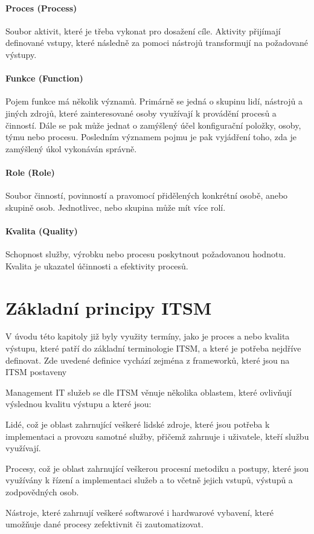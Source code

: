 \documentclass[
  digital,     %
  twoside,     %
  lof,         %
  lot,         %
]{fithesis4}
\begin{document}
\paragraph{Proces (Process)}
Soubor aktivit, které je třeba vykonat pro dosažení cíle. Aktivity přijímají definované vstupy, které následně za pomoci nástrojů transformují na požadované výstupy.
\paragraph{Funkce (Function)}
Pojem funkce má několik významů. Primárně se jedná o skupinu lidí, nástrojů a jiných zdrojů, které zainteresované osoby využívají k provádění procesů a činností. Dále se pak může jednat o zamýšlený účel konfigurační položky, osoby, týmu nebo procesu. Posledním významem pojmu je pak vyjádření toho, zda je zamýšlený úkol vykonáván správně. 
\paragraph{Role (Role)}
Soubor činností, povinností a pravomocí přidělených konkrétní osobě, anebo skupině osob. Jednotlivec, nebo skupina může mít více rolí.
\paragraph{Kvalita (Quality)}
Schopnost služby, výrobku nebo procesu poskytnout požadovanou hodnotu. Kvalita je ukazatel účinnosti a efektivity procesů.
\section{Základní principy ITSM}
V úvodu této kapitoly již byly využity termíny, jako je proces a nebo kvalita výstupu, které patří do základní terminologie ITSM, a které je potřeba nejdříve definovat. Zde uvedené definice vychází zejména z frameworků, které jsou na ITSM postaveny

Management IT služeb se dle ITSM věnuje několika oblastem, které ovlivňují výslednou kvalitu výstupu a které jsou:
\begin{compactitem}
  \item Lidé, což je oblast zahrnující veškeré lidské zdroje, které jsou potřeba k implementaci a provozu samotné služby, přičemž zahrnuje i uživatele, kteří službu využívají.
  \item Procesy, což je oblast zahrnující veškerou procesní metodiku a postupy, které jsou využívány k řízení a implementaci služeb a to včetně jejich vstupů, výstupů a zodpovědných osob.
  \item Nástroje, které zahrnují veškeré softwarové i hardwarové vybavení, které umožňuje dané procesy zefektivnit či zautomatizovat.
\end{compactitem}
\end{document}
